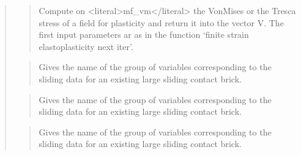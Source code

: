 \documentclass[a4paper,11pt,english]{sphinxmanual}
\begin{document}
\begin{quote}
\sphinxAtStartPar
{}
\begin{quote}

\sphinxAtStartPar
Compute on \textless{}literal\textgreater{}mf\_vm\textless{}/literal\textgreater{} the Von\sphinxhyphen{}Mises or the Tresca stress of a field for plasticity and return it into the vector V.
The first input parameters ar as in the function ‘finite strain elastoplasticity next iter’.
\end{quote}

\sphinxAtStartPar
{}
\begin{quote}

\sphinxAtStartPar
Gives the name of the group of variables corresponding to the
sliding data for an existing large sliding contact brick.
\end{quote}

\sphinxAtStartPar
{}
\begin{quote}

\sphinxAtStartPar
Gives the name of the group of variables corresponding to the
sliding data for an existing large sliding contact brick.
\end{quote}

\sphinxAtStartPar
{}
\begin{quote}

\sphinxAtStartPar
Gives the name of the group of variables corresponding to the
sliding data for an existing large sliding contact brick.
\end{quote}

\sphinxAtStartPar
{}
\begin{quote}


\end{quote}
\end{quote}
\end{document}
